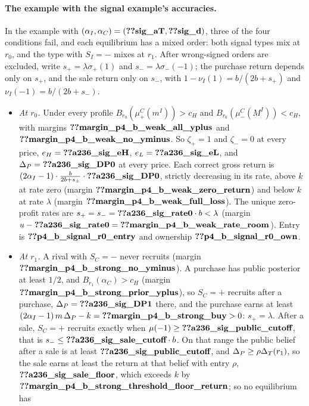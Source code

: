 \paragraph{The example with the signal example's accuracies.}
In the example with \((\alpha_I,\alpha_C)=(\reg{sig_aT},\reg{sig_d})\), three of the four conditions fail, and each equilibrium has a mixed order: both signal types mix at \(r_0\), and the
type with \(S_I=-\) mixes at \(r_1\).
After wrong-signed orders are excluded, write \(s_+=\lambda\sigma_+(1)\) and \(s_-=\lambda\sigma_-(-1)\); the purchase
return depends only on \(s_+\), and the sale return only on \(s_-\), with \(1-\nu_I(1)=b/(2b+s_+)\) and
\(\nu_I(-1)=b/(2b+s_-)\).
\begin{itemize}[leftmargin=2em]
\item \emph{At \(r_0\).} Under every profile \(B_{r_0}(\mu^C_+(m^I))>c_H\) and \(B_{r_0}(\mu^C_-(M^I))<c_H\), with margins
\(\reg{margin_p4_b_weak_all_yplus}\) and \(\reg{margin_p4_b_weak_no_yminus}\). So \(\zeta_+=1\) and \(\zeta_-=0\) at every price,
\(e_H=\reg{a236_sig_eH}\), \(e_L=\reg{a236_sig_eL}\), and \(\Delta_P=\reg{a236_sig_DP0}\) at every price. Each correct gross return is
\((2\alpha_I-1)\cdot\tfrac{b}{2b+s_\pm}\cdot\reg{a236_sig_DP0}\), strictly decreasing in its rate, above \(k\) at rate zero (margin
\(\reg{margin_p4_b_weak_zero_return}\)) and below \(k\) at rate \(\lambda\) (margin \(\reg{margin_p4_b_weak_full_loss}\)).
The unique zero-profit rates are \(s_+=s_-=\reg{a236_sig_rate0}\cdot b<\lambda\) (margin \(u-\reg{a236_sig_rate0}=\reg{margin_p4_b_weak_rate_room}\)). Entry is
\(\reg{p4_b_signal_r0_entry}\) and ownership \(\reg{p4_b_signal_r0_own}\).
\item \emph{At \(r_1\).} A rival with \(S_C=-\) never recruits (margin \(\reg{margin_p4_b_strong_no_yminus}\)). A
purchase has public posterior at least \(1/2\), and \(B_{r_1}(\alpha_C)>c_H\) (margin \(\reg{margin_p4_b_strong_prior_yplus}\)),
so \(S_C=+\) recruits after a purchase, \(\Delta_P=\reg{a236_sig_DP1}\) there, and the purchase earns at least
\((2\alpha_I-1)\,m\,\Delta_P-k=\reg{margin_p4_b_strong_buy}>0\): \(s_+=\lambda\). After a sale, \(S_C=+\) recruits exactly when
\(\mu(-1)\ge\reg{a236_sig_public_cutoff}\), that is \(s_-\le\reg{a236_sig_sale_cutoff}\cdot b\). On that range the public belief after a sale is at least \(\reg{a236_sig_public_cutoff}\), and
\(\Delta_P\ge\rho\Delta_T(r_1)\), so the sale earns at least the return at that belief with entry \(\rho\),
\(\reg{a236_sig_sale_floor}\), which exceeds \(k\) by \(\reg{margin_p4_b_strong_threshold_floor_return}\); so no equilibrium has

\end{itemize}
